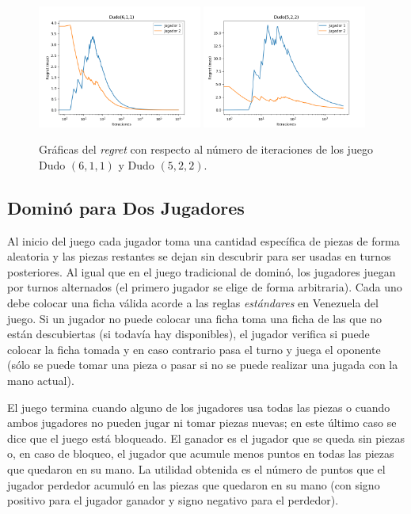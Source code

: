 \begin{figure}[h]
    \centering
    \includegraphics[width=0.48\textwidth]{graficas/cfr/dudo/Dudo(6,1,1).png}
    \includegraphics[width=0.48\textwidth]{graficas/cfr/dudo/Dudo(5,2,2).png}
    \caption{Gráficas del \textit{regret} con respecto al número de iteraciones de los juego Dudo $(6, 1, 1)$ y Dudo $(5, 2, 2)$.}
    \label{fig:cfr-regret-dudo}
\end{figure}

\subsection*{Dominó para Dos Jugadores}

Al inicio del juego cada jugador toma una cantidad específica de piezas de forma aleatoria y las piezas restantes se dejan sin descubrir para ser usadas en turnos posteriores. Al igual que en el juego tradicional de dominó, los jugadores juegan por turnos alternados (el primero jugador se elige de forma arbitraria). Cada uno debe colocar una ficha válida acorde a las reglas \textit{estándares} en Venezuela del juego. Si un jugador no puede colocar una ficha toma una ficha de las que no están descubiertas (si todavía hay disponibles), el jugador verifica si puede colocar la ficha tomada y en caso contrario pasa el turno y juega el oponente (sólo se puede tomar una pieza o pasar si no se puede realizar una jugada con la mano actual).

El juego termina cuando alguno de los jugadores usa todas las piezas o cuando ambos jugadores no pueden jugar ni tomar piezas nuevas; en este último caso se dice que el juego está bloqueado. El ganador es el jugador que se queda sin piezas o, en caso de bloqueo, el jugador que acumule menos puntos en todas las piezas que quedaron en su mano. La utilidad obtenida es el número de puntos que el jugador perdedor acumuló en las piezas que quedaron en su mano (con signo positivo para el jugador ganador y signo negativo para el perdedor).

